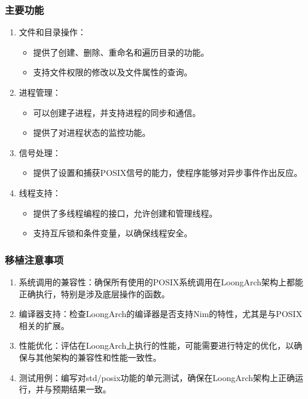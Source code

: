 \documentclass[UTF8]{ctexart}
\begin{document}
		\subsubsection{主要功能} %
		\begin{enumerate}[leftmargin=3.5em]
    			\item 文件和目录操作：
     		\begin{itemize}[leftmargin=1em]
     			\item 提供了创建、删除、重命名和遍历目录的功能。
        			\item 支持文件权限的修改以及文件属性的查询。
    			\end{itemize}
   			\item 进程管理：
    			\begin{itemize}[leftmargin=1em]
        			\item 可以创建子进程，并支持进程的同步和通信。
        			\item 提供了对进程状态的监控功能。
    			\end{itemize}
    			\item 信号处理：
    			\begin{itemize}[leftmargin=1em]
    				\item 提供了设置和捕获POSIX信号的能力，使程序能够对异步事件作出反应。
    			\end{itemize}
    			\item 线程支持：
    			\begin{itemize}[leftmargin=1em]
        			\item 提供了多线程编程的接口，允许创建和管理线程。
        			\item 支持互斥锁和条件变量，以确保线程安全。
    			\end{itemize}
		\end{enumerate}
		\subsubsection{移植注意事项} %
		\begin{enumerate}[leftmargin=3.5em]
    			\item 系统调用的兼容性：确保所有使用的POSIX系统调用在LoongArch架构上都能正确执行，特别是涉及底层操作的函数。
			\item 编译器支持：检查LoongArch的编译器是否支持Nim的特性，尤其是与POSIX相关的扩展。
   		 	\item 性能优化：评估在LoongArch上执行的性能，可能需要进行特定的优化，以确保与其他架构的兼容性和性能一致性。
    			\item 测试用例：编写对std/posix功能的单元测试，确保在LoongArch架构上正确运行，并与预期结果一致。
		\end{enumerate}
\end{document}
